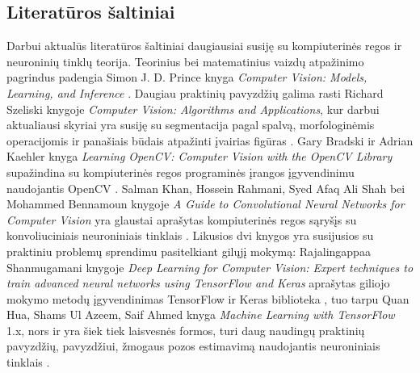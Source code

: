 \documentclass{VUMIFPSbakalaurinis}
\begin{document}
\subsection{Literatūros šaltiniai}
Darbui aktualūs literatūros šaltiniai daugiausiai susiję su kompiuterinės regos ir neuroninių tinklų teorija. Teorinius bei matematinius vaizdų atpažinimo pagrindus padengia Simon J. D. Prince knyga \textit{Computer Vision: Models, Learning, and Inference} \cite{PrinceCompVision}. Daugiau praktinių pavyzdžių galima rasti Richard Szeliski knygoje \textit{Computer Vision: Algorithms and Applications}, kur darbui aktualiausi skyriai yra susiję su segmentacija pagal spalvą, morfologinėmis operacijomis ir panašiais būdais atpažinti įvairias figūras \cite{SzeliskiCompVision}. Gary Bradski ir Adrian Kaehler knyga \textit{Learning OpenCV: Computer Vision with the OpenCV Library} supažindina su kompiuterinės regos programinės įrangos įgyvendinimu naudojantis OpenCV \cite{SzeliskiCompVision}. Salman Khan, Hossein Rahmani, Syed Afaq Ali Shah bei Mohammed Bennamoun knygoje \textit{A Guide to Convolutional Neural Networks for Computer Vision} yra glaustai aprašytas kompiuterinės regos sąryšįs su konvoliuciniais neuroniniais tinklais \cite{KhanConvVision}. Likusios dvi knygos yra susijusios su praktiniu problemų sprendimu pasitelkiant gilųjį mokymą: Rajalingappaa Shanmugamani knygoje \textit{Deep Learning for Computer Vision: Expert techniques to train advanced neural networks using TensorFlow and Keras} aprašytas giliojo mokymo metodų įgyvendinimas TensorFlow ir Keras biblioteka \cite{ShanDeepVision}, tuo tarpu Quan Hua, Shams Ul Azeem, Saif Ahmed knyga \textit{Machine Learning with TensorFlow} 1.x, nors ir yra šiek tiek laisvesnės formos, turi daug naudingų praktinių pavyzdžių, pavyzdžiui, žmogaus pozos estimavimą naudojantis neuroniniais tinklais \cite{HuaMachineLearning}.

\printbibliography[heading=bibintoc]  %
\end{document}
